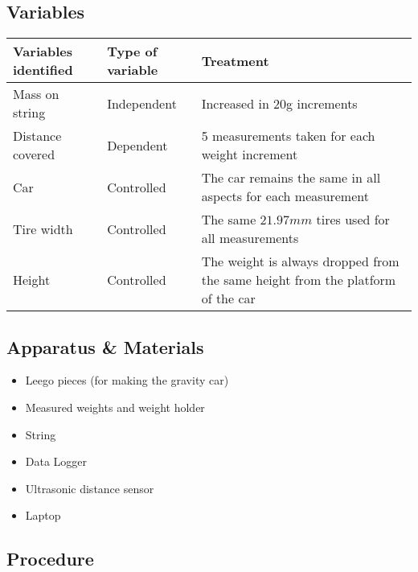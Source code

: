 \documentclass[titlepage,12pt]{article}
\begin{document}
    \subsection{Variables}
        \begin{table}[h!]
            \centering
            \label{my-label}
            \begin{tabular}{|l|l|p{5cm}|}
                \hline
                Variables identified & Type of variable   & Treatment\\
                \hline
                \hline
                Mass on string       & Independent        & Increased in 20g increments\\
                \hline
                Distance covered     & Dependent          & 5 measurements taken for each weight increment\\
                \hline
                Car                  & Controlled         & The car remains the same in all aspects for each measurement\\
                \hline
                Tire width           & Controlled         & The same $21.97mm$ tires used for all measurements\\
                \hline
                Height               & Controlled         & The weight is always dropped from the same height from the platform of the car\\
                \hline
            \end{tabular}
        \end{table}
    \FloatBarrier
    \subsection{Apparatus \& Materials}
        \begin{itemize}
            \item Leego pieces (for making the gravity car)
            \item Measured weights and weight holder
            \item String
            \item Data Logger
            \item Ultrasonic distance sensor
            \item Laptop
        \end{itemize}

    \subsection{Procedure}
\end{document}
